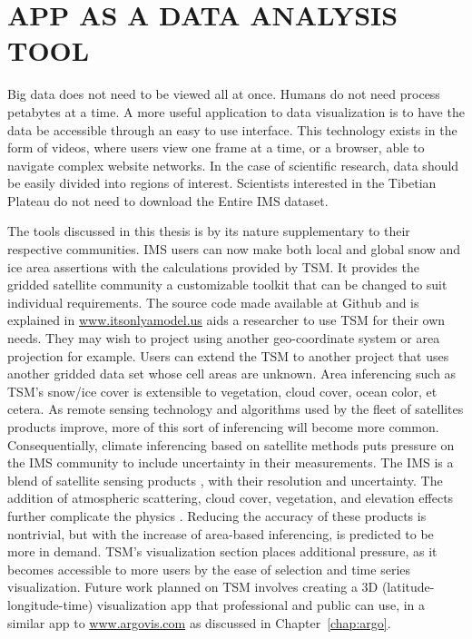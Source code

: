 \chapter{APP AS A DATA ANALYSIS TOOL}
\label{chap:conclusion}

Big data does not need to be viewed all at once. Humans do not need process petabytes at a time. A more useful application to data visualization is to have the data be accessible through an easy to use interface. This technology exists in the form of videos, where users view one frame at a time, or a browser, able to navigate complex website networks. In the case of scientific research, data should be easily divided into regions of interest. Scientists interested in the Tibetian Plateau do not need to download the Entire IMS dataset.

The tools discussed in this thesis is by its nature supplementary to their respective communities. IMS users can now make both local and global snow and ice area assertions with the calculations provided by TSM. It provides the gridded satellite community a customizable toolkit that can be changed to suit individual requirements. The source code made available at Github \cite{git_proj} and is explained in \url{www.itsonlyamodel.us} \cite{tibet_snow_man} aids a researcher to use TSM for their own needs. They may wish to project using another geo-coordinate system or area projection for example. Users can extend the TSM to another project that uses another gridded data set whose cell areas are unknown. Area inferencing such as TSM's snow/ice cover is extensible to vegetation, cloud cover, ocean color, et cetera. As remote sensing technology and algorithms used by the fleet of satellites products improve, more of this sort of inferencing will become more common. Consequentially, climate inferencing based on satellite methods puts pressure on the IMS community to include uncertainty in their measurements. The IMS is a blend of satellite sensing products \cite{nat_ice}, with their resolution and uncertainty. The addition of atmospheric scattering, cloud cover, vegetation, and elevation effects further complicate the physics \cite{basist}. Reducing the accuracy of these products is nontrivial, but with the increase of area-based inferencing, is predicted to be more in demand. TSM's visualization section places additional pressure, as it becomes accessible to more users by the ease of selection and time series visualization. Future work planned on TSM involves creating a 3D (latitude-longitude-time) visualization app that professional and public can use, in a similar app to \url{www.argovis.com} as discussed in Chapter~\ref{chap:argo}.


